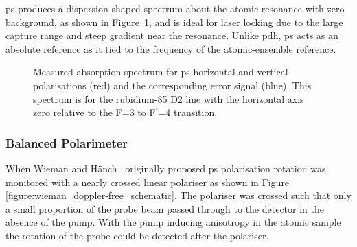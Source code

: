 
\Gls{ps} produces a dispersion shaped spectrum about the atomic resonance with zero background, as shown in Figure~\ref{figure:polspecspectrum}, and is ideal for laser locking due to the large capture range and steep gradient near the resonance.
Unlike \gls{pdh}, \gls{ps} acts as an absolute reference as it tied to the frequency of the atomic-ensemble reference.

\begin{figure}
\center

\caption[Polarisation spectroscopy absorption and error spectra.]{Measured absorption spectrum for \gls{ps} horizontal and vertical polarisations (red) and the corresponding error signal (blue). This spectrum is for the rubidium-85 D2 line with the horizontal axis zero relative to the F=3 to F$^\prime$=4 transition.}
\label{figure:polspecspectrum}
\end{figure}

\subsubsection{Balanced Polarimeter}

When Wieman and H\"anch~\cite{wieman_doppler-free_1976} originally proposed \gls{ps} polarisation rotation was monitored with a nearly crossed linear polariser as shown in Figure \ref{figure:wieman_doppler-free_schematic}.
The polariser was crossed such that only a small proportion of the probe beam passed through to the detector in the absence of the pump.
With the pump inducing anisotropy in the atomic sample the rotation of the probe could be detected after the polariser.

